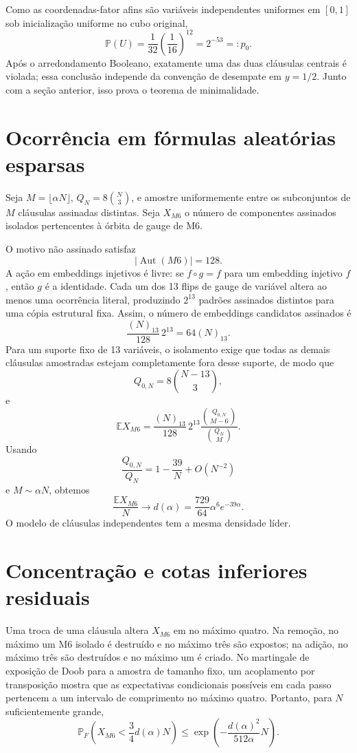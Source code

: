 \documentclass[11pt,a4paper]{article}
\begin{document}
Como as coordenadas-fator afins são variáveis independentes uniformes em $[0,1]$ sob inicialização uniforme no cubo original,
\begin{equation}
\mathbb P(U)=\frac1{32}\left(\frac1{16}\right)^{12}=2^{-53}=:p_0.
\end{equation}
Após o arredondamento Booleano, exatamente uma das duas cláusulas centrais é violada; essa conclusão independe da convenção de desempate em $y=1/2$. Junto com a seção anterior, isso prova o teorema de minimalidade.

\section{Ocorrência em fórmulas aleatórias esparsas}
Seja $M=\lfloor\alpha N\rfloor$, $Q_N=8\binom N3$, e amostre uniformemente entre os subconjuntos de $M$ cláusulas assinadas distintas. Seja $X_{M6}$ o número de componentes assinados isolados pertencentes à órbita de gauge de M6.

O motivo não assinado satisfaz
\[
|\operatorname{Aut}(M6)|=128.
\]
A ação em embeddings injetivos é livre: se $f\circ g=f$ para um embedding injetivo $f$, então $g$ é a identidade. Cada um dos 13 flips de gauge de variável altera ao menos uma ocorrência literal, produzindo $2^{13}$ padrões assinados distintos para uma cópia estrutural fixa. Assim, o número de embeddings candidatos assinados é
\[
\frac{(N)_{13}}{128}\,2^{13}=64(N)_{13}.
\]
Para um suporte fixo de 13 variáveis, o isolamento exige que todas as demais cláusulas amostradas estejam completamente fora desse suporte, de modo que
\[
Q_{0,N}=8\binom{N-13}{3},
\]
e
\begin{equation}
\mathbb E X_{M6}
=\frac{(N)_{13}}{128}\,2^{13}
\frac{\binom{Q_{0,N}}{M-6}}{\binom{Q_N}{M}}.
\end{equation}
Usando
\[
\frac{Q_{0,N}}{Q_N}=1-\frac{39}{N}+O(N^{-2})
\]
e $M\sim\alpha N$, obtemos
\begin{equation}
\frac{\mathbb E X_{M6}}{N}\longrightarrow d(\alpha)=\frac{729}{64}\alpha^6e^{-39\alpha}.
\end{equation}
O modelo de cláusulas independentes tem a mesma densidade líder.

\section{Concentração e cotas inferiores residuais}
Uma troca de uma cláusula altera $X_{M6}$ em no máximo quatro. Na remoção, no máximo um M6 isolado é destruído e no máximo três são expostos; na adição, no máximo três são destruídos e no máximo um é criado. No martingale de exposição de Doob para a amostra de tamanho fixo, um acoplamento por transposição mostra que as expectativas condicionais possíveis em cada passo pertencem a um intervalo de comprimento no máximo quatro. Portanto, para $N$ suficientemente grande,
\begin{equation}
\mathbb P_F\!\left(X_{M6}<\frac34d(\alpha)N\right)
\le\exp\!\left(-\frac{d(\alpha)^2}{512\alpha}N\right).
\end{equation}
\end{document}
